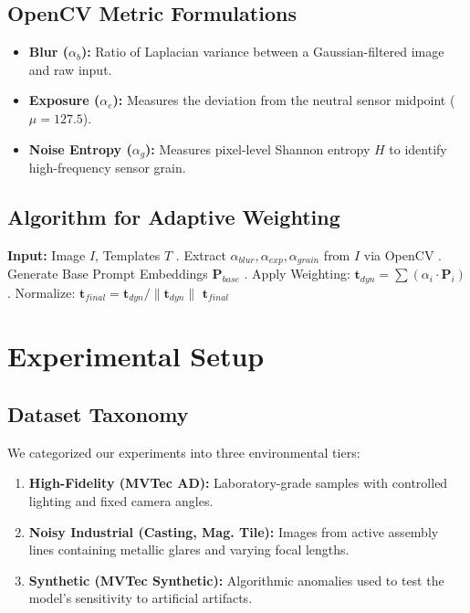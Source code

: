 \documentclass[10pt,twocolumn]{article}
\begin{document}
\subsection{OpenCV Metric Formulations}
\begin{itemize}
    \item \textbf{Blur ($\alpha_{b}$):} Ratio of Laplacian variance between a Gaussian-filtered image and raw input. 
    \item \textbf{Exposure ($\alpha_{e}$):} Measures the deviation from the neutral sensor midpoint ($\mu=127.5$).
    \item \textbf{Noise Entropy ($\alpha_{g}$):} Measures pixel-level Shannon entropy $H$ to identify high-frequency sensor grain.
\end{itemize}

\subsection{Algorithm for Adaptive Weighting}
\begin{algorithm}
\caption{Dynamic DAP Anchor Weighting}
\begin{algorithmic}
\STATE \textbf{Input:} Image $I$, Templates $T$
. Extract $\alpha_{blur}, \alpha_{exp}, \alpha_{grain}$ from $I$ via OpenCV
. Generate Base Prompt Embeddings $\mathbf{P}_{base}$
. Apply Weighting: $\mathbf{t}_{dyn} = \sum (\alpha_i \cdot \mathbf{P}_{i})$
. Normalize: $\mathbf{t}_{final} = \mathbf{t}_{dyn} / \|\mathbf{t}_{dyn}\|$
\RETURN $\mathbf{t}_{final}$
\end{algorithmic}
\end{algorithm}

\section{Experimental Setup}
\subsection{Dataset Taxonomy}
We categorized our experiments into three environmental tiers:
\begin{enumerate}
    \item \textbf{High-Fidelity (MVTec AD):} Laboratory-grade samples with controlled lighting and fixed camera angles.
    \item \textbf{Noisy Industrial (Casting, Mag. Tile):} Images from active assembly lines containing metallic glares and varying focal lengths.
    \item \textbf{Synthetic (MVTec Synthetic):} Algorithmic anomalies used to test the model's sensitivity to artificial artifacts.
\end{enumerate}
\end{document}
